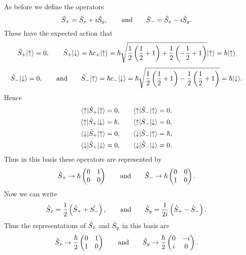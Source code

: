 As before we define the operators
\[\hat{S}_+ = \hat{S}_x + i\hat{S}_y, \qquad\text{and}\qquad \hat{S}_- = \hat{S}_x - i\hat{S}_y.\]
These have the expected action that
\[\hat{S}_+\vert {\uparrow} \rangle = 0, \qquad \hat{S}_+\vert {\downarrow} \rangle = \hbar c_+\vert {\uparrow} \rangle = \hbar \sqrt{\frac{1}{2}\left(\frac{1}{2} + 1\right) + \frac{1}{2}\left(-\frac{1}{2} + 1\right)}\vert {\uparrow} \rangle = \hbar\vert {\uparrow} \rangle\]
\[\hat{S}_-\vert {\downarrow} \rangle = 0, \qquad\text{and}\qquad \hat{S}_-\vert {\uparrow} \rangle = \hbar c_-\vert {\downarrow} \rangle = \hbar\sqrt{\frac{1}{2}\left(\frac{1}{2} + 1\right) - \frac{1}{2}\left(\frac{1}{2} + 1\right)} = \hbar\vert {\downarrow} \rangle.\]
Hence
\begin{align*}
    \langle {\uparrow} \vert\hat{S}_+\vert {\uparrow} \rangle = 0, \qquad & \langle {\uparrow} \vert\hat{S}_-\vert {\uparrow} \rangle = 0,\\
    \langle {\uparrow} \vert\hat{S}_+\vert {\downarrow} \rangle = \hbar, \qquad & \langle {\uparrow} \vert\hat{S}_-\vert {\downarrow} \rangle = 0,\\
    \langle {\downarrow} \vert\hat{S}_+\vert {\uparrow} \rangle = 0, \qquad & \langle {\downarrow} \vert\hat{S}_-\vert {\uparrow} \rangle = \hbar,\\
    \langle {\downarrow} \vert\hat{S}_+\vert {\downarrow} \rangle = 0, \qquad & \langle {\downarrow} \vert\hat{S}_-\vert {\downarrow} \rangle = 0.
\end{align*}
Thus in this basis these operators are represented by
\[
\hat{S}_+ \mathrel{\rightarrow}\hbar
\begin{pmatrix}
    0 & 1\\
    0 & 0
\end{pmatrix}
\qquad\text{and}\qquad
\hat{S}_- \mathrel{\rightarrow}\hbar
\begin{pmatrix}
    0 & 0\\
    1 & 0
\end{pmatrix}
.
\]
Now we can write
\[\hat{S}_x = \frac{1}{2}\left(\hat{S}_+ + \hat{S_-}\right), \qquad\text{and}\qquad \hat{S}_y = \frac{1}{2i}\left(\hat{S}_+ - \hat{S}_-\right).\]
Thus the representations of \(\hat{S}_x\) and \(\hat{S}_y\) in this basis are
\[
\hat{S}_x \mathrel{\rightarrow} \frac{\hbar}{2}
\begin{pmatrix}
    0 & 1\\
    1 & 0
\end{pmatrix}
\qquad\text{and}\qquad
\hat{S}_y \mathrel{\rightarrow} \frac{\hbar}{2}
\begin{pmatrix}
    0 & -i\\
    i & 0
\end{pmatrix}
.
\]
